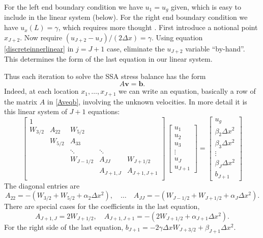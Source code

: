 \documentclass[letterpaper,final,12pt,reqno]{amsart}
\begin{document}
For the left end boundary condition we have $u_1 = u_g$ given, which is easy to include in the linear system (below).  For the right end boundary condition we have $u_x(L)=\gamma$, which requires more thought \cite{MortonMayers}.  First introduce a notional point $x_{J+2}$.  Now require $(u_{J+2} - u_J)/(2 \Delta x) = \gamma$.  Using equation \eqref{discreteinnerlinear} in $j=J+1$ case, eliminate the $u_{J+2}$ variable ``by-hand''.  This determines the form of the last equation in our linear system.

Thus each iteration to solve the SSA stress balance has the form
\begin{equation}
   A \mathbf{v} = \mathbf{b}. \label{Aveqb}
\end{equation}
Indeed, at each location $x_1,\dots,x_{J+1}$ we can write an equation, basically a row of the matrix $A$ in \eqref{Aveqb}, involving the unknown velocities.  In more detail it is this linear system of $J+1$ equations:
\begin{equation}
\begin{bmatrix}
1 &  &  &  &  \\
W_{3/2} & A_{22} & W_{5/2} &  &  \\
 & W_{5/2} & A_{33} &  &  \\
 &  & \ddots & \ddots &  \\
 &  & W_{J-1/2} & A_{JJ} & W_{J+1/2} \\
 &  &  & A_{J+1,J} & A_{J+1,J+1} \\
\end{bmatrix}\,
\begin{bmatrix}
u_1 \\ u_2 \\ u_3 \\ \vdots \\ u_J \\ u_{J+1}
\end{bmatrix}
=
\begin{bmatrix}
u_g \\ \beta_2 \Delta x^2 \\ \beta_3 \Delta x^2 \\ \vdots \\ \beta_J \Delta x^2 \\ b_{J+1}
\end{bmatrix}  \label{discretematrixform}
\end{equation}
The diagonal entries are
  $$A_{22} = -(W_{3/2}+W_{5/2}+\alpha_2 \Delta x^2), \quad \dots \quad A_{JJ} = -(W_{J-1/2}+W_{J+1/2}+\alpha_J \Delta x^2).$$
There are special cases for the coefficients in the last equation,
  $$A_{J+1,J} = 2 W_{J+1/2}, \quad A_{J+1,J+1} = -(2 W_{J+1/2}+\alpha_{J+1}\Delta x^2).$$
For the right side of the last equation, $b_{J+1} = -2 \gamma \Delta x W_{J+3/2} + \beta_{J+1} \Delta x^2$.
\end{document}
